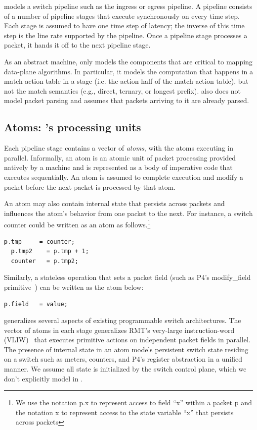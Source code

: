 \absmachine models a switch pipeline such as the ingress or egress pipeline. A
pipeline consists of a number of pipeline stages that execute synchronously on
every time step. Each stage is assumed to have one time step of latency;
the inverse of this time step is the line rate supported by the pipeline. Once
a pipeline stage processes a packet, it hands it off to the next pipeline
stage.

As an abstract machine, \absmachine only models the components that are
critical to mapping data-plane algorithms. In particular, it models the
computation that happens in a match-action table in a stage (i.e. the action
half of the match-action table), but not the match semantics (e.g., direct,
ternary, or longest prefix). \absmachine also does not model packet parsing and
assumes that packets arriving to it are already parsed.

\subsection{Atoms: \absmachine's processing units}

Each pipeline stage contains a vector of \textit{atoms}, with the atoms
executing in parallel. Informally, an atom is an atomic unit of packet
processing provided natively by a \absmachine machine and is represented
as a body of imperative code that executes sequentially. An atom is assumed to
complete execution and modify a packet before the next packet is processed by
that atom.

An atom may also contain internal state that persists across packets and
influences the atom's behavior from one packet to the next. For instance, a
switch counter could be written as an atom as follows.\footnote{We use the
  notation p.x to represent access to field ``x'' within a packet p and the
  notation x to represent access to the state variable ``x'' that persists across packets}
  \begin{lstlisting}[style=customc]
  p.tmp     = counter;
  p.tmp2    = p.tmp + 1;
  counter   = p.tmp2;
  \end{lstlisting}
Similarly, a stateless operation that sets a packet field (such as P4's
modify\_field primitive~\cite{p4spec}) can be written as the atom
below:
\begin{lstlisting}[style=customc]
p.field   = value;
\end{lstlisting}

\absmachine generalizes several aspects of existing programmable switch
architectures. The vector of atoms in each stage generalizes RMT's very-large
instruction-word (VLIW)~\cite{rmt} that executes primitive actions on
independent packet fields in parallel. The presence of internal state in an
atom models persistent switch state residing on a switch such as meters,
counters, and P4's register abstraction in a unified manner. We assume all
state is initialized by the switch control plane, which we don't explicitly
model in \absmachine.

